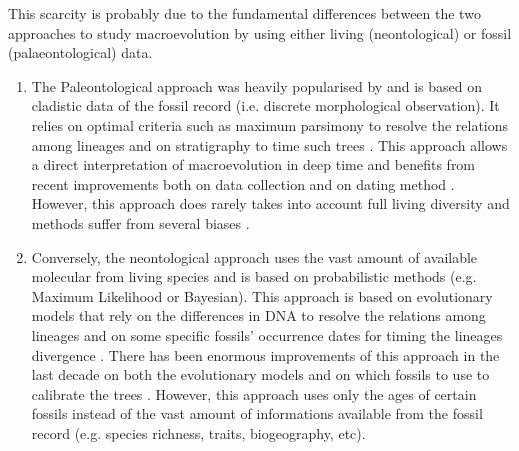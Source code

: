 
This scarcity %
is probably due to the fundamental differences between the two approaches to study macroevolution by using either living (neontological) or fossil (palaeontological) data.

\begin{enumerate}
\item The Paleontological approach was heavily popularised by \cite{simpson1945} and is based on cladistic data of the fossil record (i.e. discrete morphological observation).
It relies on optimal criteria such as maximum parsimony \citep{Hennig1966,felsenstein2004} to resolve the relations among lineages and on stratigraphy to time such trees \citep{GoloboffTNT}.
This approach allows a direct interpretation of macroevolution in deep time and benefits from recent improvements both on data collection \citep[e.g. ``phenomics'';][]{O'Leary08022013} and on dating method \citep[e.g. the \textit{cal3} method;][]{Bapst2014}.
However, this approach does rarely takes into account full living diversity \citep[e.g. 119 fossil and 38 living primates in][]{ni2013oldest} and methods suffer from several biases \citep[e.g. parsimony][]{wrightbayesian2014}.

\item Conversely, the neontological approach uses the vast amount of available molecular from living species and is based on probabilistic methods (e.g. Maximum Likelihood or Bayesian).
This approach is based on evolutionary models that rely on the differences in DNA to resolve the relations among lineages and on some specific fossils' occurrence dates for timing the lineages divergence \citep[i.e. the molecular clock][]{zuckerkandl1965}.
There has been enormous improvements of this approach in the last decade on both the evolutionary models \citep[e.g.][]{bapsta2013,stadlerdating2013,heaththe2013} and on which fossils to use to calibrate the trees \citep{Donoghue2007424,Parham01032012}.
However, this approach uses only the ages of certain fossils instead of the vast amount of informations available from the fossil record (e.g. species richness, traits, biogeography, etc).
\end{enumerate}


